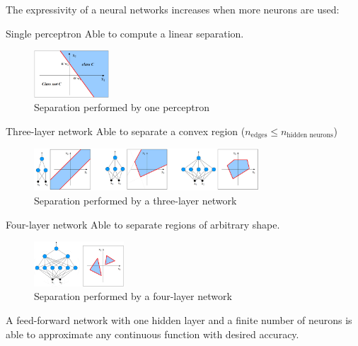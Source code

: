 The expressivity of a neural networks increases when more neurons are used:
\begin{descriptionlist}
    \item[Single perceptron] 
        Able to compute a linear separation.
        \begin{figure}[h]
            \centering
            \includegraphics[width=0.25\textwidth]{img/1perceptron.png}
            \caption{Separation performed by one perceptron}
        \end{figure}
    \item[Three-layer network] 
        Able to separate a convex region ($n_\text{edges} \leq n_\text{hidden neurons}$)
        \begin{figure}[h]
            \centering
            \includegraphics[width=0.75\textwidth]{img/3layer.png}
            \caption{Separation performed by a three-layer network}
        \end{figure}
    \item[Four-layer network] 
        Able to separate regions of arbitrary shape.
        \begin{figure}[h]
            \centering
            \includegraphics[width=0.30\textwidth]{img/4layer.png}
            \caption{Separation performed by a four-layer network}
        \end{figure}
\end{descriptionlist}

\begin{theorem} 
    A feed-forward network with one hidden layer and a finite number of neurons is
    able to approximate any continuous function with desired accuracy.
\end{theorem}

